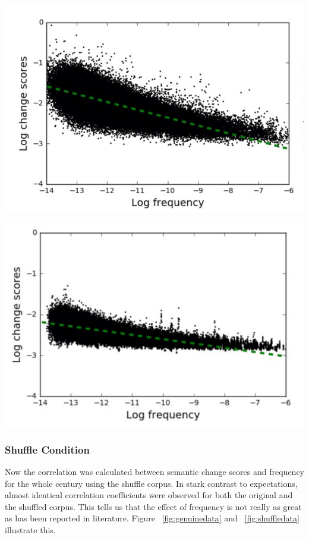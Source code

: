 \documentclass[a0,landscape]{a0poster}
\begin{document}
\begin{multicols}{4}
\begin{center}\vspace{1cm}
  \includegraphics[width=0.8\linewidth]{image7.png}
  \label{fig:genuinedata}
\end{center}\vspace{1cm}

\begin{center}\vspace{1cm}
  \includegraphics[width=0.8\linewidth]{image5.png}
  \label{fig:shuffledata}
\end{center}\vspace{1cm}

\subsubsection*{Shuffle Condition} 
Now the correlation was calculated between semantic change scores and frequency for the whole century using the shuffle corpus. In stark contrast to expectations, almost identical correlation coefficients were observed for both the original and the shuffled corpus. This tells us that the effect of frequency is not really as great as has been reported in literature. Figure ~\ref{fig:genuinedata} and ~\ref{fig:shuffledata} illustrate this.



\end{multicols}
\end{document}
